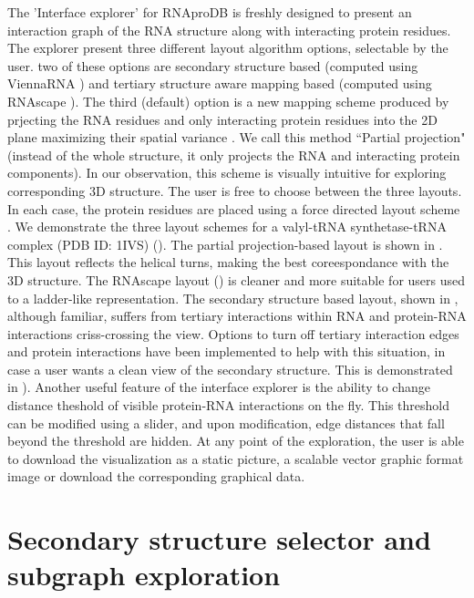 The 'Interface explorer' for RNAproDB is freshly designed to present an interaction graph of the RNA structure along with interacting protein residues. The explorer present three different layout algorithm options, selectable by the user. two of these options are secondary structure based (computed using ViennaRNA \citep{Lorenz2011}) and tertiary structure aware mapping based (computed using RNAscape \citep{Mitra2024rnascape}). The third (default) option is a new mapping scheme produced by prjecting the RNA residues and only interacting protein residues into the 2D plane maximizing their spatial variance \citep{Pearson1901}. We call this method ``Partial projection" (instead of the whole structure, it only projects the RNA and interacting protein components). In our observation, this scheme is visually intuitive for exploring corresponding 3D structure. The user is free to choose between the three layouts. In each case, the protein residues are placed using a force directed layout scheme \citep{bostock2012fl}. We demonstrate the three layout schemes for a valyl-tRNA synthetase-tRNA complex (PDB ID: 1IVS) (). The partial projection-based layout is shown in . This layout reflects the helical turns, making the best coreespondance with the 3D structure. The RNAscape \citep{Mitra2024rnascape} layout () is cleaner and more suitable for users used to a ladder-like representation.  The secondary structure based layout, shown in , although familiar, suffers from tertiary interactions within RNA and protein-RNA interactions criss-crossing the view. Options to turn off tertiary interaction edges and protein interactions have been implemented to help with this situation, in case a user wants a clean view of the secondary structure. This is demonstrated in ). Another useful feature of the interface explorer is the ability to change distance theshold of visible protein-RNA interactions on the fly. This threshold can be modified using a slider, and upon modification, edge distances that fall beyond the threshold are hidden. At any point of the exploration, the user is able to download the visualization as a static picture, a scalable vector graphic format image or download the corresponding graphical data.

\section{Secondary structure selector and subgraph exploration}

